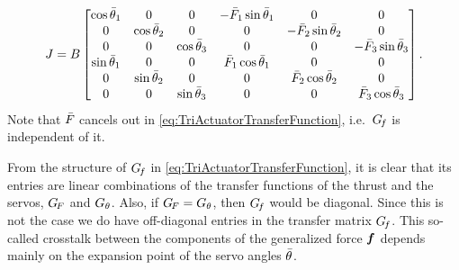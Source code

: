\begin{align}
 J = B
 \begin{bmatrix}
  \cos\aServoStat[1] & 0 & 0 & -\PropForceStat[1] \sin\aServoStat[1] & 0 & 0 \\
  0 & \cos\aServoStat[2] & 0 & 0 & -\PropForceStat[2] \sin\aServoStat[2] & 0 \\
  0 & 0 & \cos\aServoStat[3] & 0 & 0 & -\PropForceStat[3] \sin\aServoStat[3] \\
  \sin\aServoStat[1] & 0 & 0 & \PropForceStat[1] \cos\aServoStat[1] & 0 & 0 \\
  0 & \sin\aServoStat[2] & 0 & 0 & \PropForceStat[2] \cos\aServoStat[2] & 0 \\
  0 & 0 & \sin\aServoStat[3] & 0 & 0 & \PropForceStat[3] \cos\aServoStat[3] \\
 \end{bmatrix}
 .
\end{align}
Note that $\PropForceStat$ cancels out in \eqref{eq:TriActuatorTransferFunction}, i.e.\ $\GenForceTransferFunction$ is independent of it.

From the structure of $\GenForceTransferFunction$ in \eqref{eq:TriActuatorTransferFunction}, it is clear that its entries are linear combinations of the transfer functions of the thrust and the servos, $\ThrustTransferFunction$ and $\ServoTransferFunction$.
Also, if $\ThrustTransferFunction = \ServoTransferFunction$, then $\GenForceTransferFunction$ would be diagonal.
Since this is not the case we do have off-diagonal entries in the transfer matrix $\GenForceTransferFunction$.
This so-called crosstalk between the components of the generalized force $\genForce$ depends mainly on the expansion point of the servo angles $\aServoStat$.

